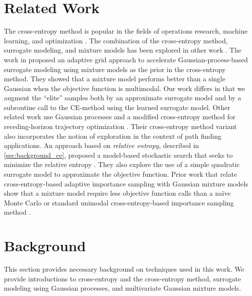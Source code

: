 \section{Related Work} \label{sec:related_work}
The cross-entropy method is popular in the fields of operations research, machine learning, and optimization \cite{kochenderfer2015decision,Kochenderfer2019}.
The combination of the cross-entropy method, surrogate modeling, and mixture models has been explored in other work \cite{bardenet2010surrogating}. 
The work in \cite{bardenet2010surrogating} proposed an adaptive grid approach to accelerate Gaussian-process-based surrogate modeling using mixture models as the prior in the cross-entropy method. They showed that a mixture model performs better than a single Gaussian when the objective function is multimodal.
Our work differs in that we augment the ``elite'' samples both by an approximate surrogate model and by a subroutine call to the CE-method using the learned surrogate model.
Other related work use Gaussian processes and a modified cross-entropy method for receding-horizon trajectory optimization \cite{tan2018gaussian}.
Their cross-entropy method variant also incorporates the notion of exploration in the context of path finding applications.
An approach based on \textit{relative entropy}, described in \cref{sec:background_ce}, proposed a model-based stochastic search that seeks to minimize the relative entropy \cite{NIPS2015_5672}. They also explore the use of a simple quadratic surrogate model to approximate the objective function.
Prior work that relate cross-entropy-based adaptive importance sampling with Gaussian mixture models show that a mixture model require less objective function calls than a na\"ive Monte Carlo or standard unimodal cross-entropy-based importance sampling method \cite{kurtz2013cross,wang2016cross}.


\section{Background} \label{sec:background}
This section provides necessary background on techniques used in this work. We provide introductions to cross-entropy and the cross-entropy method, surrogate modeling using Gaussian processes, and multivariate Gaussian mixture models.


